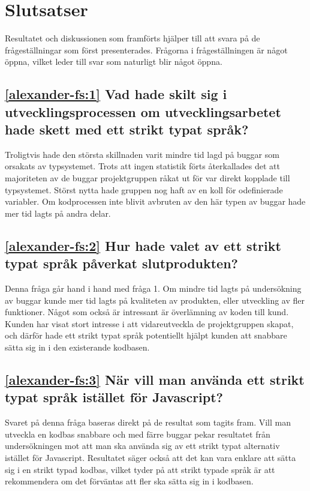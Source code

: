 \section{Slutsatser}
\label{sec:alexander-conclusion}

Resultatet och diskussionen som framförts hjälper till att svara på de frågeställningar som först presenterades.  Frågorna i frågeställningen är något öppna, vilket leder till svar som naturligt blir något öppna.

\subsection*{\ref{alexander-fs:1} Vad hade skilt sig i utvecklingsprocessen om utvecklingsarbetet hade skett med ett strikt typat språk?}
Troligtvis hade den största skillnaden varit mindre tid lagd på buggar som orsakats av typsystemet. Trots att ingen statistik förts återkallades det att majoriteten av de buggar projektgruppen råkat ut för var direkt kopplade till typsystemet. Störst nytta hade gruppen nog haft av en koll för odefinierade variabler. Om kodprocessen inte blivit avbruten av den här typen av buggar hade mer tid lagts på andra delar.

\subsection*{\ref{alexander-fs:2} Hur hade valet av ett strikt typat språk påverkat slutprodukten?}
Denna fråga går hand i hand med fråga 1. Om mindre tid lagts på undersökning av buggar kunde mer tid lagts på kvaliteten av produkten, eller utveckling av fler funktioner. Något som också är intressant är överlämning av koden till kund. Kunden har visat stort intresse i att vidareutveckla de projektgruppen skapat, och därför hade ett strikt typat språk potentiellt hjälpt kunden att snabbare sätta sig in i den existerande kodbasen.

\subsection*{\ref{alexander-fs:3} När vill man använda ett strikt typat språk istället för Javascript?}
Svaret på denna fråga baseras direkt på de resultat som tagits fram. Vill man utveckla en kodbas snabbare och med färre buggar pekar resultatet från undersökningen mot att man ska använda sig av ett strikt typat alternativ istället för Javascript. Resultatet säger också att det kan vara enklare att sätta sig i en strikt typad kodbas, vilket tyder på att strikt typade språk är att rekommendera om det förväntas att fler ska sätta sig in i kodbasen.  
